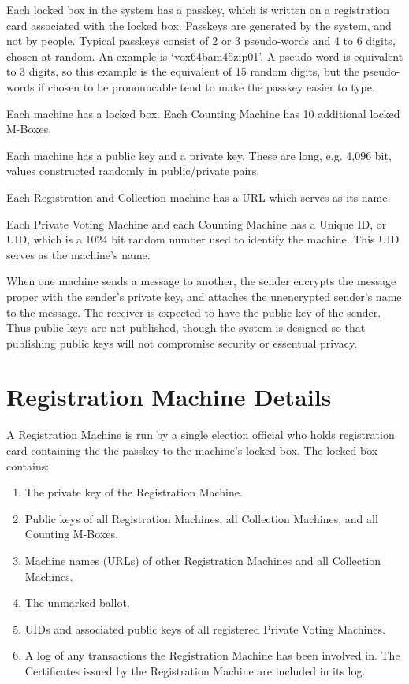 \documentclass[12pt]{article}
\begin{document}
Each locked box in the system has a passkey, which is
written on a registration card associated with the locked
box.  Passkeys are generated by the system, and not by
people.  Typical passkeys consist of 2 or 3 pseudo-words
and 4 to 6 digits, chosen at random.  An example is
`vox64bam45zip01'.  A pseudo-word is equivalent to 3
digits, so this example is the equivalent of 15 random
digits, but the pseudo-words if chosen to be pronouncable
tend to make the passkey easier to type.

Each machine has a locked box.  Each Counting
Machine has 10 additional locked M-Boxes.

Each machine has a public key and a private key.  These
are long, e.g. 4,096 bit, values constructed randomly
in public/private pairs.

Each Registration and Collection
machine has a URL which serves as its name.

Each Private Voting Machine and each Counting Machine
has a Unique ID, or UID, which is a 1024 bit random number
used to identify the machine.  This UID serves as the
machine's name.

When one machine sends a message to another, the sender
encrypts the message proper with the sender's private
key, and attaches the unencrypted sender's name to the
message.  The receiver is expected to have the public
key of the sender.  Thus public keys are not published,
though the system is designed so that publishing public
keys will not compromise security or essentual privacy.

\section{Registration Machine Details}

A Registration Machine is run by a single election official
who holds registration card containing the the passkey to
the machine's locked box.  The
locked box contains:
\begin{enumerate}
\item The private key of the Registration Machine.
\item Public keys of all Registration Machines, all Collection
Machines, and all Counting M-Boxes.
\item Machine names (URLs) of other Registration Machines and all Collection
Machines.
\item The unmarked ballot.
\item UIDs and associated public keys of all registered Private Voting
Machines.
\item A log of any transactions the Registration Machine has
been involved in.  The Certificates issued by the Registration Machine
are included in its log.
\end{enumerate}
\end{document}
